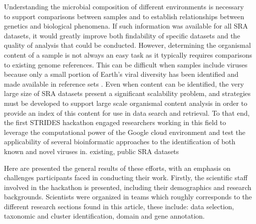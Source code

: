   Understanding the microbial composition of different environments is
  necessary to support comparisons between samples and to establish
  relationships between genetics and biological phenomena. If such information
  was available for all SRA datasets, it would greatly improve both findability
  of specific datasets and the quality of analysis that could be conducted.
  However, determining the organismal content of a sample is not always an easy
  task as it typically requires comparisons to existing genome references. This
  can be difficult when samples include viruses because only a small portion of
  Earth’s viral diversity has been identified and made available in reference
  sets \cite{Carroll2018}. Even when content can be identified, the very large
  size of SRA datasets present a significant scalability problem, and
  strategies must be developed to support large scale organismal content
  analysis in order to provide an index of this content for use in data search
  and retrieval. To that end, the first STRIDES hackathon engaged researchers
  working in this field to leverage the computational power of the Google cloud
  environment and test the applicability of several bioinformatic approaches to
  the identification of both known and novel viruses in.   existing, public SRA
  datasets

  Here are presented the general results of these efforts, with an emphasis on
  challenges participants faced in conducting their work. Firstly, the
  scientific staff involved in the hackathon is presented, including their
  demographics and research backgrounds. Scientists were organized in teams
  which roughly corresponds to the different research sections found in this
  article, these include: data selection, taxonomic and cluster identification,
  domain and gene annotation.
